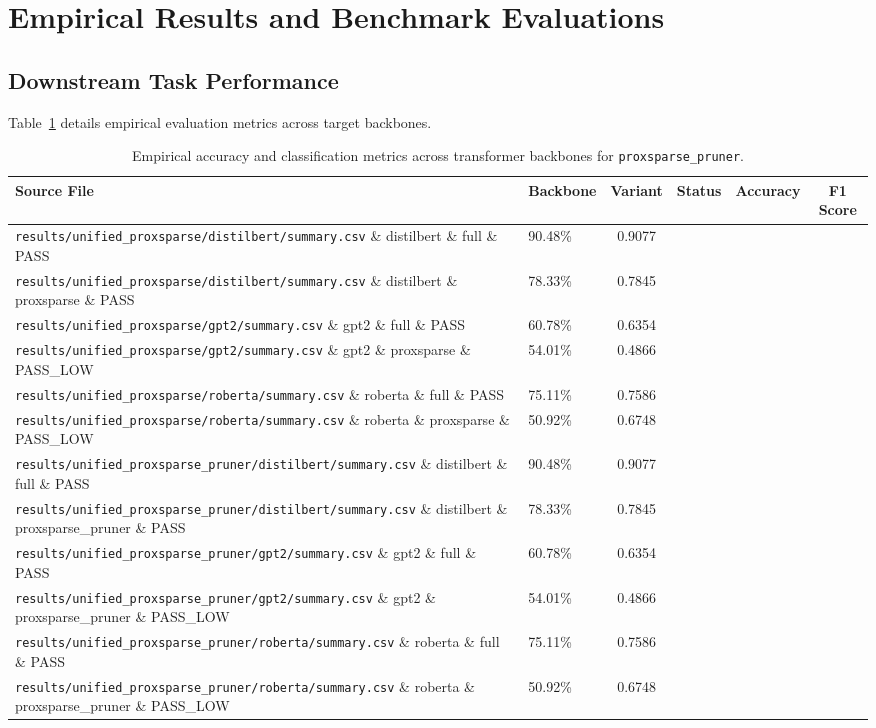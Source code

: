 \section{Empirical Results and Benchmark Evaluations}

\subsection{Downstream Task Performance}
Table~\ref{tab:results_acc_proxsparse_pruner} details empirical evaluation metrics across target backbones.

\begin{table}[t]
\centering
\small
\begin{tabularx}{\linewidth}{llcccc}
\toprule
\textbf{Source File} & \textbf{Backbone} & \textbf{Variant} & \textbf{Status} & \textbf{Accuracy} & \textbf{F1 Score} \\
\midrule
\texttt{results/unified\_proxsparse/distilbert/summary.csv} \& distilbert \& full \& PASS & 90.48\% & 0.9077 \\
\texttt{results/unified\_proxsparse/distilbert/summary.csv} \& distilbert \& proxsparse \& PASS & 78.33\% & 0.7845 \\
\texttt{results/unified\_proxsparse/gpt2/summary.csv} \& gpt2 \& full \& PASS & 60.78\% & 0.6354 \\
\texttt{results/unified\_proxsparse/gpt2/summary.csv} \& gpt2 \& proxsparse \& PASS\_LOW & 54.01\% & 0.4866 \\
\texttt{results/unified\_proxsparse/roberta/summary.csv} \& roberta \& full \& PASS & 75.11\% & 0.7586 \\
\texttt{results/unified\_proxsparse/roberta/summary.csv} \& roberta \& proxsparse \& PASS\_LOW & 50.92\% & 0.6748 \\
\texttt{results/unified\_proxsparse\_pruner/distilbert/summary.csv} \& distilbert \& full \& PASS & 90.48\% & 0.9077 \\
\texttt{results/unified\_proxsparse\_pruner/distilbert/summary.csv} \& distilbert \& proxsparse\_pruner \& PASS & 78.33\% & 0.7845 \\
\texttt{results/unified\_proxsparse\_pruner/gpt2/summary.csv} \& gpt2 \& full \& PASS & 60.78\% & 0.6354 \\
\texttt{results/unified\_proxsparse\_pruner/gpt2/summary.csv} \& gpt2 \& proxsparse\_pruner \& PASS\_LOW & 54.01\% & 0.4866 \\
\texttt{results/unified\_proxsparse\_pruner/roberta/summary.csv} \& roberta \& full \& PASS & 75.11\% & 0.7586 \\
\texttt{results/unified\_proxsparse\_pruner/roberta/summary.csv} \& roberta \& proxsparse\_pruner \& PASS\_LOW & 50.92\% & 0.6748 \\
\bottomrule
\end{tabularx}
\caption{Empirical accuracy and classification metrics across transformer backbones for \texttt{proxsparse\_pruner}.}
\label{tab:results_acc_proxsparse_pruner}
\end{table}

